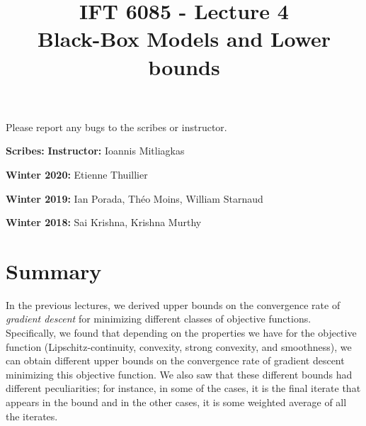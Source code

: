 \documentclass{article}
\title{IFT 6085 - Lecture 4 \\ 
Black-Box Models and Lower bounds }
\date{}
\begin{document}
 

\maketitle

\vspace{-0.5in}
\begin{center}
Please report any bugs to the scribes or instructor.
\end{center}
\vspace{0.2in}

\textbf{Scribes:}
\hfill
\textbf{Instructor:} Ioannis Mitliagkas

\textbf{Winter 2020:} Etienne Thuillier

\textbf{Winter 2019:} Ian Porada, Th\'eo Moins, William Starnaud 

\textbf{Winter 2018:} Sai Krishna, Krishna Murthy 



\newcommand{\infgc}{\inf_{g \in \mathcal{C}}}
\newcommand{\supgc}{\sup_{g \in \mathcal{C}}}

\newcommand{\Prob}{\mathbb{P}}
\newcommand{\E}{\mathbb{E}}
\newcommand{\reals}{\mathbb{R}}


\section{Summary}

In the previous lectures, we derived upper bounds on the convergence rate of \emph{gradient descent} for minimizing different classes of objective functions.
Specifically, we found that depending on the properties we have for the objective function (Lipschitz-continuity, convexity, strong convexity, and smoothness), we can obtain different upper bounds on the convergence rate of gradient descent minimizing this objective function. 
We also saw that these different bounds had different peculiarities; for instance, in some of the cases, it is the final iterate that appears in the bound and in the other cases, it is some weighted average of all the iterates. \\
\end{document}
